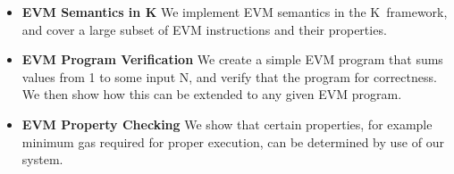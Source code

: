 \begin{itemize}
\item{\bf EVM Semantics in K} We implement EVM semantics in the K~framework, and
cover a large subset of EVM instructions and their properties.
\item{\bf EVM Program Verification} We create a simple EVM program that sums
values from 1 to some input N, and verify that the program for correctness. We then show how this can be extended to any given EVM program.
\item{\bf EVM Property Checking} We show that certain properties, for example
minimum gas required for proper execution, can be determined by use of our system.
\end{itemize}
